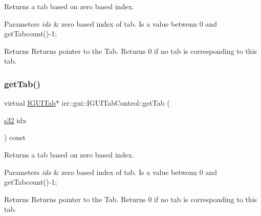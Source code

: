 Returns a tab based on zero based index. 


\begin{DoxyParams}{Parameters}
{\em idx} & zero based index of tab. Is a value betwenn 0 and get\+Tabcount()-\/1; \\
\hline
\end{DoxyParams}
\begin{DoxyReturn}{Returns}
Returns pointer to the Tab. Returns 0 if no tab is corresponding to this tab. 
\end{DoxyReturn}
\mbox{\label{classirr_1_1gui_1_1IGUITabControl_a1ce91106037c880aae15df77f42aeeda}} 
\subsubsection{\texorpdfstring{get\+Tab()}{getTab()}\hspace{0.1cm}{\footnotesize\ttfamily [2/2]}}
{\footnotesize\ttfamily virtual \hyperlink{classirr_1_1gui_1_1IGUITab}{I\+G\+U\+I\+Tab}$\ast$ irr\+::gui\+::\+I\+G\+U\+I\+Tab\+Control\+::get\+Tab (\begin{DoxyParamCaption}\item[{\hyperlink{namespaceirr_ac66849b7a6ed16e30ebede579f9b47c6}{s32}}]{idx }\end{DoxyParamCaption}) const\hspace{0.3cm}{\ttfamily [pure virtual]}}



Returns a tab based on zero based index. 


\begin{DoxyParams}{Parameters}
{\em idx} & zero based index of tab. Is a value betwenn 0 and get\+Tabcount()-\/1; \\
\hline
\end{DoxyParams}
\begin{DoxyReturn}{Returns}
Returns pointer to the Tab. Returns 0 if no tab is corresponding to this tab. 
\end{DoxyReturn}
\mbox{\label{classirr_1_1gui_1_1IGUITabControl_abe529c6da00af1e156357562eafec031}} 
